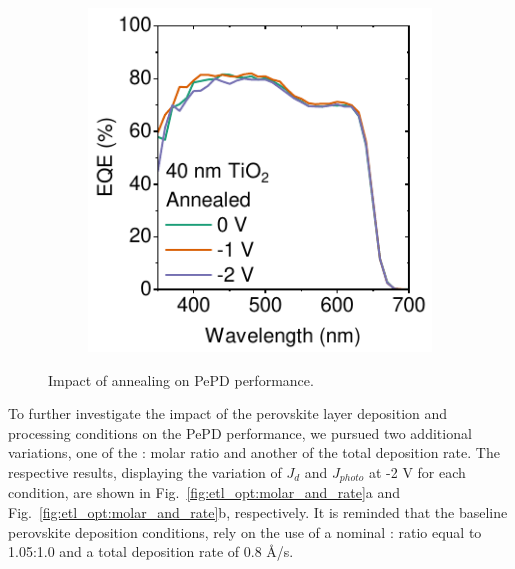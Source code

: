 \begin{figure}[htbp]
\begin{subfigure}[t]{0.32\textwidth}
        \caption{}
        \label{fig:ch2:as_dep_eqe}
    \end{subfigure}
    \hfill
    \begin{subfigure}[t]{0.32\textwidth}
        \centering
        \includegraphics[width=\textwidth]{chapters/material_properties/images/Annealed_EQE.pdf} %
        \caption{}
        \label{fig:ch2:annealed_eqe}
    \end{subfigure}
    \caption{Impact of annealing on PePD performance.}
    \label{fig:ETL_opt:annealing_impact}
\end{figure}

To further investigate the impact of the perovskite layer deposition and processing conditions on the PePD performance, we pursued two additional variations, one of the : molar ratio and another of the total deposition rate. The respective results, displaying the variation of $J_d$ and $J_{photo}$ at -2 V for each condition, are shown in Fig.~\ref{fig:etl_opt:molar_and_rate}a and Fig.~\ref{fig:etl_opt:molar_and_rate}b, respectively. It is reminded that the baseline perovskite deposition conditions, rely on the use of a nominal : ratio equal to 1.05:1.0 and a total deposition rate of 0.8 \AA/s. 

